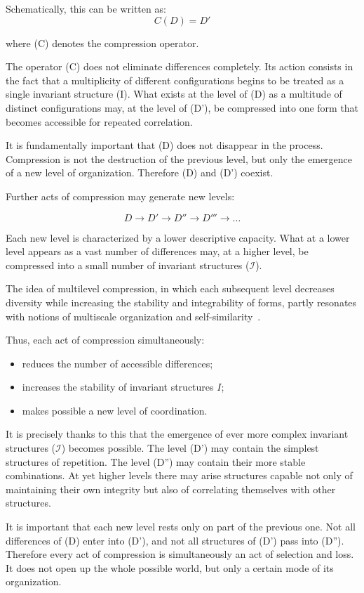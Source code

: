 \documentclass[aps,prd,onecolumn,nofootinbib,superscriptaddress]{revtex4-2}
\begin{document}
Schematically, this can be written as:
\[C(D)=D'\]

where (C) denotes the compression operator.

The operator (C) does not eliminate differences completely. Its action consists in the fact that a multiplicity of different configurations begins to be treated as a single invariant structure (I). What exists at the level of (D) as a multitude of distinct configurations may, at the level of (D'), be compressed into one form that becomes accessible for repeated correlation.

It is fundamentally important that (D) does not disappear in the process. Compression is not the destruction of the previous level, but only the emergence of a new level of organization. Therefore (D) and (D') coexist.

Further acts of compression may generate new levels:

\[ D \to D' \to D'' \to D''' \to \dots \]

Each new level is characterized by a lower descriptive capacity. What at a lower level appears as a vast number of differences may, at a higher level, be compressed into a small number of invariant structures ($\mathcal{I}$).

The idea of multilevel compression, in which each subsequent level decreases diversity while increasing the stability and integrability of forms, partly resonates with notions of multiscale organization and self-similarity~\cite{Mandelbrot1982,Mandelbrot1977}.

Thus, each act of compression simultaneously:
\begin{itemize}
    \item reduces the number of accessible differences;
    \item increases the stability of invariant structures \(I\);
    \item makes possible a new level of coordination.
\end{itemize}

It is precisely thanks to this that the emergence of ever more complex invariant structures ($\mathcal{I}$) becomes possible. The level (D') may contain the simplest structures of repetition. The level (D'') may contain their more stable combinations. At yet higher levels there may arise structures capable not only of maintaining their own integrity but also of correlating themselves with other structures.

It is important that each new level rests only on part of the previous one. Not all differences of (D) enter into (D'), and not all structures of (D') pass into (D''). Therefore every act of compression is simultaneously an act of selection and loss. It does not open up the whole possible world, but only a certain mode of its organization.
\end{document}
